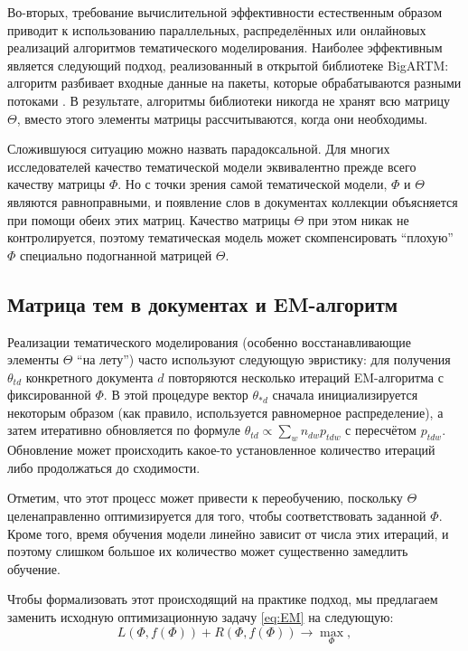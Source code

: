 Во-вторых, требование вычислительной эффективности естественным образом приводит к использованию параллельных, распределённых или онлайновых реализаций алгоритмов тематического моделирования. Наиболее эффективным является следующий подход, реализованный в открытой библиотеке BigARTM: алгоритм разбивает входные данные на пакеты, которые обрабатываются разными потоками \cite{frei2016parallel}. В результате, алгоритмы библиотеки никогда не хранят всю матрицу $\Theta$, вместо этого элементы матрицы рассчитываются, когда они необходимы.

Сложившуюся ситуацию можно назвать парадоксальной. Для многих исследователей качество тематической модели эквивалентно прежде всего качеству матрицы $\Phi$. Но с точки зрения самой тематической модели, $\Phi$ и $\Theta$ являются равноправными, и появление слов в документах коллекции объясняется при помощи обеих этих матриц. Качество матрицы $\Theta$ при этом никак не контролируется, поэтому тематическая модель может скомпенсировать ``плохую'' $\Phi$ специально подогнанной матрицей $\Theta$.

\subsection{Матрица тем в документах и EM-алгоритм}
\label{sec:theta_inference}

Реализации тематического моделирования (особенно  восстанавливающие элементы $\Theta$ ``на лету'') часто используют следующую эвристику: для получения $\theta_{td}$ конкретного документа $d$ повторяются несколько итераций EM-алгоритма с фиксированной $\Phi$. В этой процедуре вектор $\theta_{\ast d}$ сначала инициализируется некоторым образом (как правило, используется равномерное распределение), а затем итеративно обновляется по формуле $\theta_{td}  \propto \sum_{w} n_{dw} p_{tdw}$ с пересчётом $p_{tdw}$. Обновление может происходить какое-то установленное количество итераций либо продолжаться до сходимости.

Отметим, что этот процесс может привести к переобучению, поскольку $\Theta$ целенаправленно оптимизируется для того, чтобы соответствовать заданной $\Phi$. Кроме того, время обучения модели линейно зависит от числа этих итераций, и поэтому слишком большое их количество может существенно замедлить обучение.

Чтобы формализовать этот происходящий на практике подход, мы предлагаем заменить исходную оптимизационную задачу \ref{eq:EM} на следующую:
\begin{equation} \label{eq:tEM}
L(\Phi, f(\Phi) ) + R(\Phi, f(\Phi) ) \to \max_{\Phi},
\end{equation}

